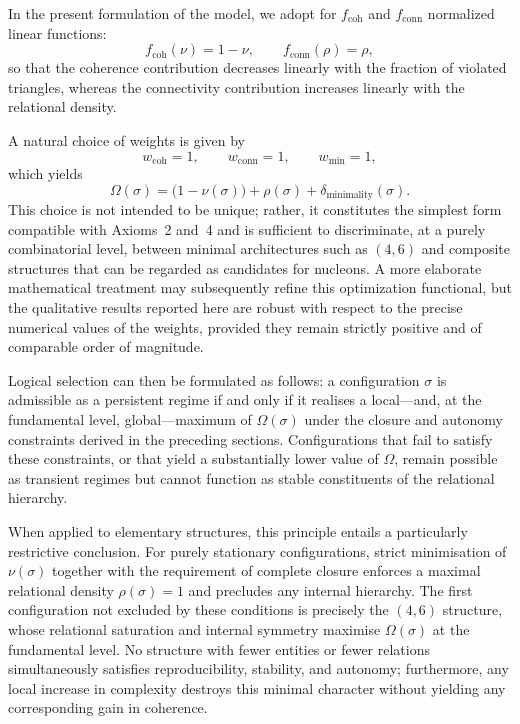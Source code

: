 \documentclass[11pt,a4paper]{article}
\begin{document}
In the present formulation of the model, we adopt for \(f_{\mathrm{coh}}\) and \(f_{\mathrm{conn}}\) normalized linear functions:
\[
f_{\mathrm{coh}}(\nu) = 1 - \nu,
\qquad
f_{\mathrm{conn}}(\rho) = \rho,
\]
so that the coherence contribution decreases linearly with the fraction of violated triangles, whereas the connectivity contribution increases linearly with the relational density.

A natural choice of weights is given by
\[
w_{\mathrm{coh}} = 1, \qquad
w_{\mathrm{conn}} = 1, \qquad
w_{\mathrm{min}} = 1,
\]
which yields
\[
\Omega(\sigma) = \bigl(1 - \nu(\sigma)\bigr) + \rho(\sigma) + \delta_{\text{minimality}}(\sigma).
\]
This choice is not intended to be unique; rather, it constitutes the simplest form compatible with Axioms~2 and~4 and is sufficient to discriminate, at a purely combinatorial level, between minimal architectures such as \((4,6)\) and composite structures that can be regarded as candidates for nucleons. A more elaborate mathematical treatment may subsequently refine this optimization functional, but the qualitative results reported here are robust with respect to the precise numerical values of the weights, provided they remain strictly positive and of comparable order of magnitude.

Logical selection can then be formulated as follows: a configuration \(\sigma\) is admissible as a persistent regime if and only if it realises a local—and, at the fundamental level, global—maximum of \(\Omega(\sigma)\) under the closure and autonomy constraints derived in the preceding sections. Configurations that fail to satisfy these constraints, or that yield a substantially lower value of \(\Omega\), remain possible as transient regimes but cannot function as stable constituents of the relational hierarchy.

When applied to elementary structures, this principle entails a particularly restrictive conclusion. For purely stationary configurations, strict minimisation of \(\nu(\sigma)\) together with the requirement of complete closure enforces a maximal relational density \(\rho(\sigma) = 1\) and precludes any internal hierarchy. The first configuration not excluded by these conditions is precisely the \((4,6)\) structure, whose relational saturation and internal symmetry maximise \(\Omega(\sigma)\) at the fundamental level. No structure with fewer entities or fewer relations simultaneously satisfies reproducibility, stability, and autonomy; furthermore, any local increase in complexity destroys this minimal character without yielding any corresponding gain in coherence.
\end{document}
